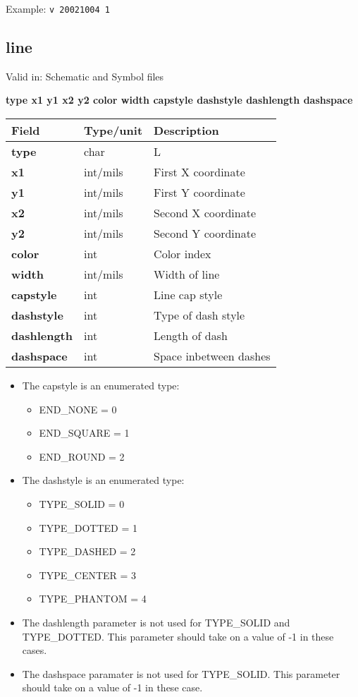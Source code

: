 \documentclass{article}
\begin{document}
Example: \newline
{\tt v 20021004 1}


\subsection{line}

Valid in: Schematic and Symbol files

{\bf type x1 y1 x2 y2 color width capstyle dashstyle dashlength dashspace}

\begin{table}[h]
\begin{tabular}{|l|l|l|} \hline
Field 		& Type/unit 	& Description \\ \hline 
\hline
{\bf type} 	& char 		& L \\ \hline
{\bf x1} 	& int/mils 	& First X coordinate \\ \hline
{\bf y1} 	& int/mils 	& First Y coordinate \\ \hline
{\bf x2} 	& int/mils 	& Second X coordinate \\ \hline
{\bf y2} 	& int/mils 	& Second Y coordinate \\ \hline
{\bf color} 	& int 		& Color index \\ \hline
{\bf width} 	& int/mils 	& Width of line \\ \hline
{\bf capstyle} 	& int 		& Line cap style \\ \hline
{\bf dashstyle} & int 		& Type of dash style \\ \hline
{\bf dashlength}& int 		& Length of dash \\ \hline
{\bf dashspace} & int 		& Space inbetween dashes \\ \hline
\end{tabular}
\end{table}

\begin{itemize}
\item The capstyle is an enumerated type: 
\begin{itemize}
	\item END\_NONE = 0
	\item END\_SQUARE = 1
	\item END\_ROUND = 2
\end{itemize}
\item The dashstyle is an enumerated type: 
\begin{itemize}
	\item TYPE\_SOLID = 0 
	\item TYPE\_DOTTED = 1
	\item TYPE\_DASHED = 2
	\item TYPE\_CENTER = 3
        \item TYPE\_PHANTOM = 4
\end{itemize}
\item The dashlength parameter is not used for TYPE\_SOLID and TYPE\_DOTTED.  
      This parameter should take on a value of -1 in these cases.
\item The dashspace paramater is not used for TYPE\_SOLID.
      This parameter should take on a value of -1 in these case.
\end{itemize}
\end{document}
